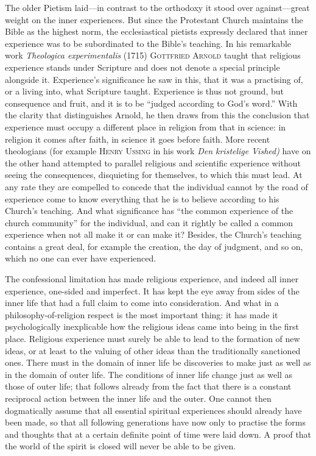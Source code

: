 \documentclass[12pt,a4paper]{book}
\newcommand{\opage}[1]{\marginnote{\footnotesize\textit{[#1]}}}
\begin{document}
The older Pietism laid---in contrast to the orthodoxy it stood over
against---great weight on the inner experiences. But since the Protestant
Church maintains the Bible as the highest norm, the ecclesiastical pietists
expressly declared that inner experience was to be subordinated to the Bible's
teaching. In his remarkable work \emph{Theologica experimentalis} (1715)
\textsc{Gottfried Arnold} taught that religious experience stands under
Scripture and does not denote a special principle alongside it. Experience's
significance he saw in this, that it was a practising of, or a living into,
what Scripture taught. Experience is thus not ground, but consequence and
fruit, and it is to be ``judged according to God's word.'' With the clarity
that distinguishes Arnold, he then draws from this the conclusion that
experience must occupy a different place in religion from that in science: in
religion it comes after faith, in science it goes before faith. More recent
theologians (for example \textsc{Henry Ussing} in his work \emph{Den kristelige
Vished)} have on the other hand attempted to parallel religious and scientific
experience without seeing the consequences, disquieting for themselves, to
which this must lead. At any rate they are compelled to concede that the
individual cannot by the road of experience come to know everything that he is
to believe according to his Church's teaching. And what significance has ``the
common experience of the church community'' for the individual, and can it
rightly be called a common experience when not all make it or can make it?
Besides, the Church's teaching contains a great deal, for example the creation,
the day of judgment, and so on, which no one can ever have experienced.

The confessional limitation has made religious experience, and indeed all inner
experience, one-sided and imperfect. It has kept the eye away from sides of the
inner life that had a full claim to come into consideration. And what in a
philosophy-of-religion respect is the most important thing: it has made it
psychologically inexplicable how the religious ideas came into being in the
first place. Religious experience must surely be able to lead to the formation
of new ideas, or at least to the valuing of other ideas than the traditionally
sanctioned ones. There must in the domain of inner life be discoveries to make
just as well as in the domain of outer life. The conditions of inner life
change just as well as those of outer life; that follows already from the fact
that there is a constant reciprocal action between the inner life and the
outer. One cannot 
\opage{61}then dogmatically assume that all essential spiritual
experiences should already have been made, so that all following generations
have now only to practise the forms and thoughts that at a certain definite
point of time were laid down. A proof that the world of the spirit is closed
will never be able to be given.
\end{document}
